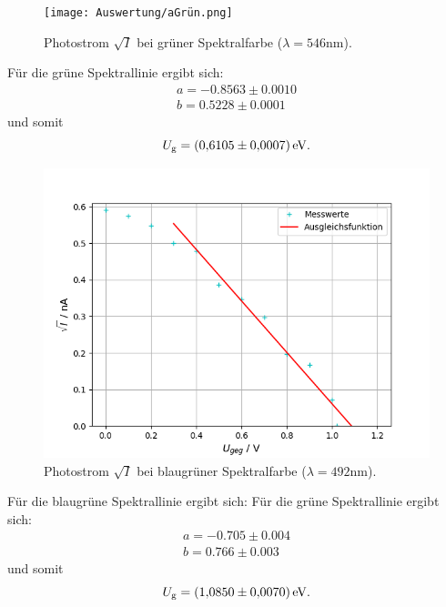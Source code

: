 \begin{figure}[H]
    \centering
    \texttt{[image: Auswertung/aGrün.png]}
    \caption{Photostrom $\sqrt{I}$ bei grüner Spektralfarbe ($\lambda = 546 \text{nm}$).}
    \label{fig:grün}
\end{figure}
Für die grüne Spektrallinie ergibt sich:
\begin{gather*}
	a =  -0.8563 \pm 0.0010\\
	b =  0.5228 \pm 0.0001
\end{gather*}
und somit 
\begin{equation*}
	U_\text{g} = \SI{0,6105 \pm 0,0007}{\eV} .
\end{equation*}

\begin{figure}[H]
    \centering
    \includegraphics[scale=0.7]{Auswertung/aZyan.png}
    \caption{Photostrom $\sqrt{I}$ bei blaugrüner Spektralfarbe ($\lambda = 492 \text{nm}$).}
    \label{fig:blaugrün}
\end{figure}
Für die blaugrüne Spektrallinie ergibt sich:
Für die grüne Spektrallinie ergibt sich:
\begin{gather*}
	a =  -0.705 \pm 0.004\\
	b =  0.766 \pm 0.003
\end{gather*}
und somit 
\begin{equation*}
	U_\text{g} = \SI{1.085 \pm 0.0070}{\eV} .
\end{equation*}

